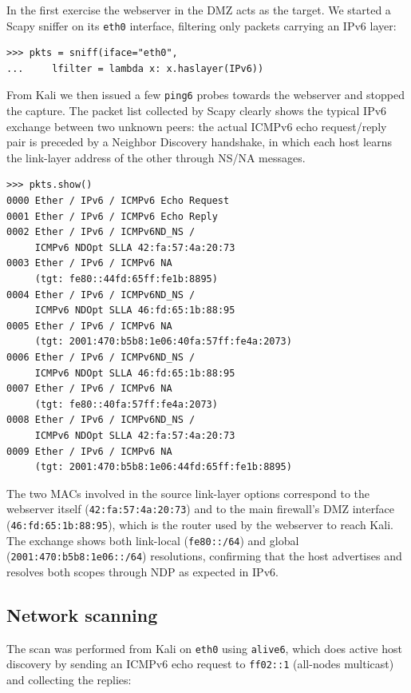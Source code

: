 \documentclass[twocolumn]{NobArticle}
\begin{document}
In the first exercise the webserver in the DMZ acts as the target. We
started a Scapy sniffer on its \texttt{eth0} interface, filtering only
packets carrying an IPv6 layer:

\begin{lstlisting}
>>> pkts = sniff(iface="eth0",
...     lfilter = lambda x: x.haslayer(IPv6))
\end{lstlisting}

From Kali we then issued a few \texttt{ping6} probes towards the webserver
and stopped the capture. The packet list collected by Scapy clearly shows
the typical IPv6 exchange between two unknown peers: the actual ICMPv6 echo
request/reply pair is preceded by a Neighbor Discovery handshake, in which
each host learns the link-layer address of the other through NS/NA
messages.

\begin{lstlisting}
>>> pkts.show()
0000 Ether / IPv6 / ICMPv6 Echo Request
0001 Ether / IPv6 / ICMPv6 Echo Reply
0002 Ether / IPv6 / ICMPv6ND_NS /
     ICMPv6 NDOpt SLLA 42:fa:57:4a:20:73
0003 Ether / IPv6 / ICMPv6 NA
     (tgt: fe80::44fd:65ff:fe1b:8895)
0004 Ether / IPv6 / ICMPv6ND_NS /
     ICMPv6 NDOpt SLLA 46:fd:65:1b:88:95
0005 Ether / IPv6 / ICMPv6 NA
     (tgt: 2001:470:b5b8:1e06:40fa:57ff:fe4a:2073)
0006 Ether / IPv6 / ICMPv6ND_NS /
     ICMPv6 NDOpt SLLA 46:fd:65:1b:88:95
0007 Ether / IPv6 / ICMPv6 NA
     (tgt: fe80::40fa:57ff:fe4a:2073)
0008 Ether / IPv6 / ICMPv6ND_NS /
     ICMPv6 NDOpt SLLA 42:fa:57:4a:20:73
0009 Ether / IPv6 / ICMPv6 NA
     (tgt: 2001:470:b5b8:1e06:44fd:65ff:fe1b:8895)
\end{lstlisting}

The two MACs involved in the source link-layer options correspond to the
webserver itself (\texttt{42:fa:57:4a:20:73}) and to the main firewall's
DMZ interface (\texttt{46:fd:65:1b:88:95}), which is the router used by the
webserver to reach Kali. The exchange shows both link-local
(\texttt{fe80::/64}) and global (\texttt{2001:470:b5b8:1e06::/64})
resolutions, confirming that the host advertises and resolves both scopes
through NDP as expected in IPv6.

\subsection{Network scanning}

The scan was performed from Kali on \texttt{eth0} using \texttt{alive6},
which does active host discovery by sending an ICMPv6 echo request to
\texttt{ff02::1} (all-nodes multicast) and collecting the replies:
\end{document}
